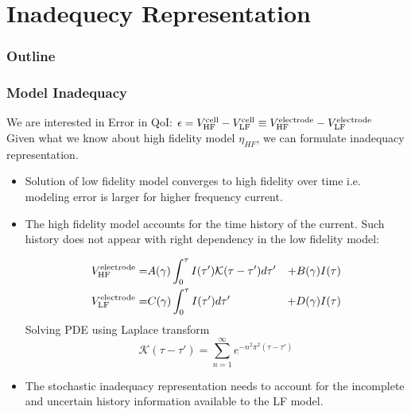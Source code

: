 \documentclass[10pt,xcolor=dvipsnames,compress]{beamer}
\begin{document}
\section{Inadequecy Representation}
\begin{frame}
\frametitle{Outline}
\vfill

\vspace{0.7in}
\vspace{0.7in}

\vfill
\end{frame}

\begin{frame}
\frametitle{Model Inadequacy}
\vfill

We are interested in Error in QoI: \quad $\epsilon = V^{\rm cell}_{\rm HF} - V^{\rm cell}_{\rm LF}  \equiv V^{\rm electrode}_{\rm HF} - V^{\rm electrode}_{\rm LF} $\\
Given what we know about high fidelity model $\eta_{HF}$, we can formulate inadequacy representation. 

\begin{problock}{}
\begin{itemize}
\item Solution of low fidelity model converges to high fidelity over time i.e. modeling error is larger for higher frequency current. 
\item The high fidelity model accounts for the time history of the current. Such history does not appear with right dependency in the low fidelity model: 
%
\begin{small}
\begin{eqnarray*}
V^{\rm electrode}_{\rm HF} =& A(\gamma)\int_0^{\tau} I(\tau') \mathcal{K}(\tau-\tau') d\tau' &+ B(\gamma) I(\tau)\\
V^{\rm electrode}_{\rm LF} =& C(\gamma)\int_0^{\tau} I(\tau') d\tau' &+ D(\gamma) I(\tau)
\end{eqnarray*}
Solving PDE using Laplace transform
\[
\textstyle{
\mathcal{K}(\tau-\tau') = 
 \sum_{n=1}^\infty  e^{-n^2\pi^2(\tau-\tau')}
}
\]
\end{small}
\item The stochastic inadequacy representation needs to account for the incomplete and uncertain history information available to the LF model.
\end{itemize}
\end{problock}


\vfill
\end{frame}
\end{document}
